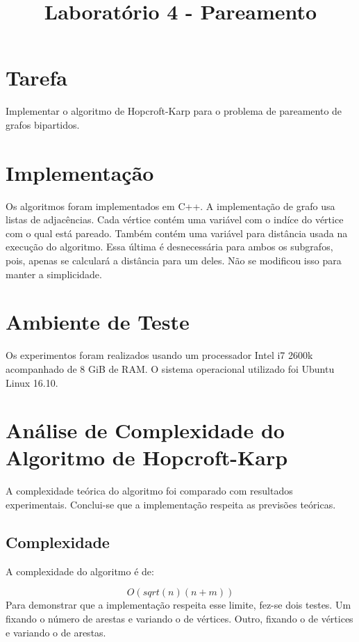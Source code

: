 \documentclass{iiufrgs}
\title{Laboratório 4 - Pareamento}
\author{}{Thiago Bell}
\begin{document}
\maketitle

\setcounter{chapter}{1}

\section{Tarefa}
Implementar o algoritmo de Hopcroft-Karp para o problema de pareamento de grafos bipartidos.

\section{Implementaç\~ao}
Os algoritmos foram implementados em C++. A implementação de grafo usa listas de adjacências. Cada vértice contém uma variável com o indíce
do vértice com o qual está pareado. Também contém uma variável para distância usada na execução do algoritmo. Essa última é desnecessária 
para ambos os subgrafos, pois, apenas
se calculará a distância para um deles. Não se modificou isso para manter a simplicidade.

\section{Ambiente de Teste}
Os experimentos foram realizados usando um processador Intel i7 2600k acompanhado de 8 GiB de RAM. 
O sistema operacional utilizado foi Ubuntu Linux 16.10.

\section{Análise de Complexidade do Algoritmo de Hopcroft-Karp}
A complexidade teórica do algoritmo foi comparado com resultados experimentais.
Conclui-se que a implementaç\~ao respeita as previs\~oes teóricas.

\subsection{Complexidade}
A complexidade do algoritmo é de:

\begin{equation*}
\label{eq:ql}
O(sqrt(n)(n+m))
\end{equation*}
Para demonstrar que a implementação respeita esse limite, fez-se dois testes. Um fixando o número de arestas e variando o de vértices.
Outro, fixando o de vértices e variando o de arestas.
\end{document}
